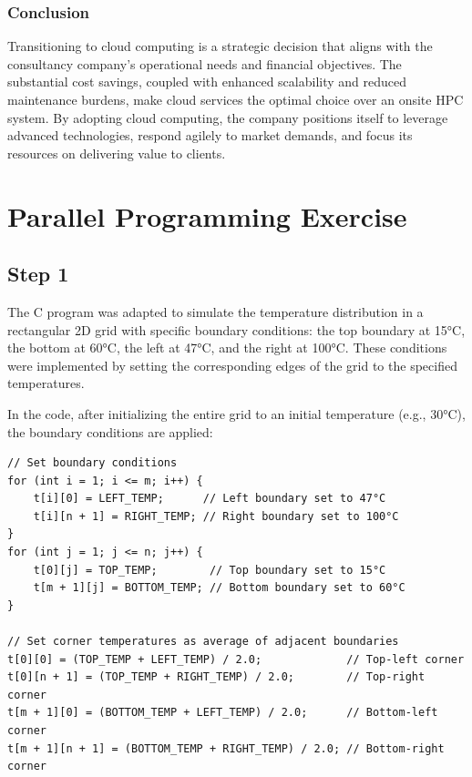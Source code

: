 \documentclass{article}
\begin{document}
\subsubsection{Conclusion}
Transitioning to cloud computing is a strategic decision that aligns with the consultancy company's operational needs and financial objectives. The substantial cost savings, coupled with enhanced scalability and reduced maintenance burdens, make cloud services the optimal choice over an onsite HPC system. By adopting cloud computing, the company positions itself to leverage advanced technologies, respond agilely to market demands, and focus its resources on delivering value to clients.

\section{Parallel Programming Exercise}

\subsection{Step 1}

The C program was adapted to simulate the temperature distribution in a rectangular 2D grid with specific boundary conditions: the top boundary at 15°C, the bottom at 60°C, the left at 47°C, and the right at 100°C. These conditions were implemented by setting the corresponding edges of the grid to the specified temperatures.

In the code, after initializing the entire grid to an initial temperature (e.g., 30°C), the boundary conditions are applied:

\begin{lstlisting}[style=CStyle, caption={Setting Boundary Conditions}]
// Set boundary conditions
for (int i = 1; i <= m; i++) {
    t[i][0] = LEFT_TEMP;      // Left boundary set to 47°C
    t[i][n + 1] = RIGHT_TEMP; // Right boundary set to 100°C
}
for (int j = 1; j <= n; j++) {
    t[0][j] = TOP_TEMP;        // Top boundary set to 15°C
    t[m + 1][j] = BOTTOM_TEMP; // Bottom boundary set to 60°C
}

// Set corner temperatures as average of adjacent boundaries
t[0][0] = (TOP_TEMP + LEFT_TEMP) / 2.0;             // Top-left corner
t[0][n + 1] = (TOP_TEMP + RIGHT_TEMP) / 2.0;        // Top-right corner
t[m + 1][0] = (BOTTOM_TEMP + LEFT_TEMP) / 2.0;      // Bottom-left corner
t[m + 1][n + 1] = (BOTTOM_TEMP + RIGHT_TEMP) / 2.0; // Bottom-right corner
\end{lstlisting}
\end{document}
